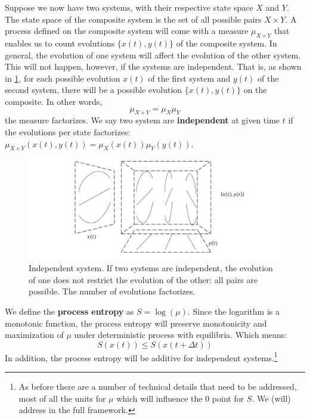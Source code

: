 \documentclass[letterpaper,twocolumn]{article}
\begin{document}
Suppose we now have two systems, with their respective state space $X$ and $Y$. The state space of the composite system is the set of all possible pairs $X \times Y$. A process defined on the composite system will come with a measure $\mu_{X \times Y}$ that enables us to count evolutions $\{x(t), y(t)\}$ of the composite system. In general, the evolution of one system will affect the evolution of the other system. This will not happen, however, if the systems are independent. That is, as shown in \ref{fig_independence}, for each possible evolution $x(t)$ of the first system and $y(t)$ of the second system, there will be a possible evolution $\{x(t), y(t)\}$ on the composite. In other words,
\begin{equation}
	\mu_{X \times Y} = \mu_X \mu_Y
\end{equation}
the measure factorizes. We say two system are \textbf{independent} at given time $t$ if the evolutions per state factorizes: $\mu_{X \times Y}(x(t), y(t)) = \mu_X (x(t)) \mu_Y (y(t))$.

\begin{figure}[h]
	\includegraphics[width=\columnwidth]{images/Slide7.png}
	\caption{Independent system. If two systems are independent, the evolution of one does not restrict the evolution of the other: all pairs are possible. The number of evolutions factorizes.}\label{fig_independence}
\end{figure}

We define the \textbf{process entropy} as $S = \log(\mu)$. Since the logarithm is a monotonic function, the process entropy will preserve monotonicity and maximization of $\mu$ under deterministic process with equilibria. Which means:
\begin{equation}\label{ov_entropy_increases}
S(x(t)) \leq S(x(t + \Delta t))
\end{equation}
In addition, the process entropy will be additive for independent systems.\footnote{As before there are a number of technical details that need to be addressed, most of all the units for $\mu$ which will influence the 0 point for $S$. We (will) address in the full framework.}
\end{document}
